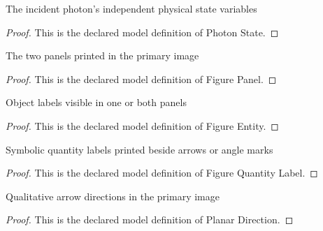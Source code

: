 \begin{definition}
  \label{def:physics:phyx-mini-0613:phyxminiproblems-problemphyxmini0613-photonstate}
  The incident photon's independent physical state variables
\end{definition}
\begin{proof}
  This is the declared model definition of Photon State.
\end{proof}
\begin{definition}
  \label{def:physics:phyx-mini-0613:phyxminiproblems-problemphyxmini0613-figurepanel}
  The two panels printed in the primary image
\end{definition}
\begin{proof}
  This is the declared model definition of Figure Panel.
\end{proof}
\begin{definition}
  \label{def:physics:phyx-mini-0613:phyxminiproblems-problemphyxmini0613-figureentity}
  Object labels visible in one or both panels
\end{definition}
\begin{proof}
  This is the declared model definition of Figure Entity.
\end{proof}
\begin{definition}
  \label{def:physics:phyx-mini-0613:phyxminiproblems-problemphyxmini0613-figurequantitylabel}
  Symbolic quantity labels printed beside arrows or angle marks
\end{definition}
\begin{proof}
  This is the declared model definition of Figure Quantity Label.
\end{proof}
\begin{definition}
  \label{def:physics:phyx-mini-0613:phyxminiproblems-problemphyxmini0613-planardirection}
  Qualitative arrow directions in the primary image
\end{definition}
\begin{proof}
  This is the declared model definition of Planar Direction.
\end{proof}
